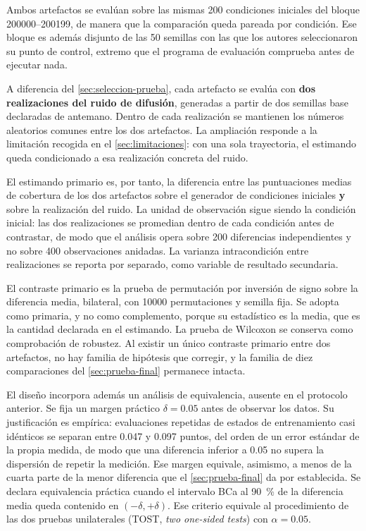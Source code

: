 
Ambos artefactos se eval\'uan sobre las mismas \num{200} condiciones iniciales del bloque
\numrange{200000}{200199}, de manera que la comparaci\'on queda pareada por condici\'on. Ese
bloque es adem\'as disjunto de las \num{50} semillas con las que los autores seleccionaron su
punto de control, extremo que el programa de evaluaci\'on comprueba antes de ejecutar nada.

A diferencia del \cref{sec:seleccion-prueba}, cada artefacto se eval\'ua con \textbf{dos
realizaciones del ruido de difusi\'on}, generadas a partir de dos semillas base declaradas de
antemano. Dentro de cada realizaci\'on se mantienen los n\'umeros aleatorios comunes entre
los dos artefactos. La ampliaci\'on responde a la limitaci\'on recogida en el
\cref{sec:limitaciones}: con una sola trayectoria, el estimando queda condicionado a esa
realizaci\'on concreta del ruido.

El estimando primario es, por tanto, la diferencia entre las puntuaciones medias de cobertura
de los dos artefactos sobre el generador de condiciones iniciales \textbf{y} sobre la
realizaci\'on del ruido. La unidad de observaci\'on sigue siendo la condici\'on inicial: las
dos realizaciones se promedian dentro de cada condici\'on antes de contrastar, de modo que el
an\'alisis opera sobre \num{200} diferencias independientes y no sobre \num{400}
observaciones anidadas. La varianza intracondici\'on entre realizaciones se reporta por
separado, como variable de resultado secundaria.


El contraste primario es la prueba de permutaci\'on por inversi\'on de signo sobre la
diferencia media, bilateral, con \num{10000} permutaciones y semilla fija. Se adopta como
primaria, y no como complemento, porque su estad\'istico es la media, que es la cantidad
declarada en el estimando. La prueba de Wilcoxon se conserva como comprobaci\'on de robustez.
Al existir un \'unico contraste primario entre dos artefactos, no hay familia de
hip\'otesis que corregir, y la familia de diez comparaciones del \cref{sec:prueba-final}
permanece intacta.

El dise\~no incorpora adem\'as un an\'alisis de equivalencia, ausente en el protocolo
anterior. Se fija un margen pr\'actico $\delta = \num{0.05}$ antes de observar los datos. Su
justificaci\'on es emp\'irica: evaluaciones repetidas de estados de entrenamiento casi
id\'enticos se separan entre \num{0.047} y \num{0.097} puntos, del orden de un error
est\'andar de la propia medida, de modo que una diferencia inferior a \num{0.05} no supera la
dispersi\'on de repetir la medici\'on. Ese margen equivale, asimismo, a menos de la cuarta
parte de la menor diferencia que el \cref{sec:prueba-final} da por establecida. Se declara
equivalencia pr\'actica cuando el intervalo BCa al \SI{90}{\percent} de la diferencia media
queda contenido en $(-\delta, +\delta)$. Ese criterio equivale al procedimiento de las dos
pruebas unilaterales (TOST, \textit{two one-sided tests}) con $\alpha = \num{0.05}$.

